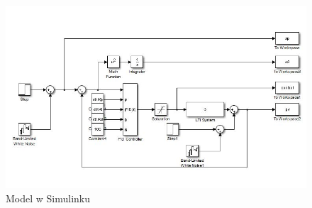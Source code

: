 \begin{figure}[H]
	\includegraphics[width=140mm]{ClosedLoopModel.jpg}
	\caption{Model w Simulinku}
	\label{fig:model_simulink}
\end{figure}

